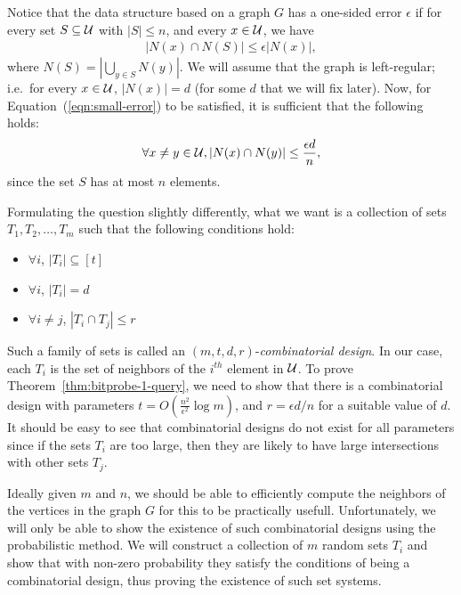 Notice that the data structure based on a graph $G$ has a one-sided error
$\epsilon$ if for every set $S\subseteq {\cal U}$ with $|S| \leq n$, and every
$x\in {\cal U}$, we have
\begin{align}
  |N(x) \cap N(S)| \leq \epsilon |N(x)|,
  \label{eqn:small-error}
\end{align}
where $N(S) = \left| \bigcup_{y\in S} N(y) \right|$. We will assume that the
graph is left-regular; i.e.\ for every $x\in {\cal U}$, $|N(x)| = d$ (for some
$d$ that we will fix later). Now, for Equation~(\ref{eqn:small-error}) to be
satisfied, it is sufficient that the following holds:
\begin{align}
  \forall x\neq y \in {\cal U}, |N(x) \cap N(y)| \leq \frac{\epsilon d}{n},
  \label{eqn:small-error-suff}
\end{align}
since the set $S$ has at most $n$ elements.

Formulating the question slightly differently, what we want is a collection of
sets $T_1, T_2, \ldots, T_m$ such that the following conditions hold:
\begin{itemize}
\item $\forall i$, $|T_i| \subseteq [t]$
\item $\forall i$, $|T_i| = d$
\item $\forall i\neq j$, $|T_i \cap T_j| \leq r$
\end{itemize}

Such a family of sets is called an $(m,t,d,r)$-\emph{combinatorial design}. In
our case, each $T_i$ is the set of neighbors of the $i^{th}$ element in
${\cal U}$. To prove Theorem~\ref{thm:bitprobe-1-query}, we need to show that
there is a combinatorial design with parameters
$t = O\left( \frac{n^2}{\epsilon^2}\log m \right)$, and $r = \epsilon d/n$ for a
suitable value of $d$. It should be easy to see that combinatorial designs do
not exist for all parameters since if the sets $T_i$ are too large, then they
are likely to have large intersections with other sets $T_j$.

Ideally given $m$ and $n$, we should be able to efficiently compute the
neighbors of the vertices in the graph $G$ for this to be practically
usefull. Unfortunately, we will only be able to show the existence of such
combinatorial designs using the probabilistic method. We will construct a
collection of $m$ random sets $T_i$ and show that with non-zero probability they
satisfy the conditions of being a combinatorial design, thus proving the
existence of such set systems.

